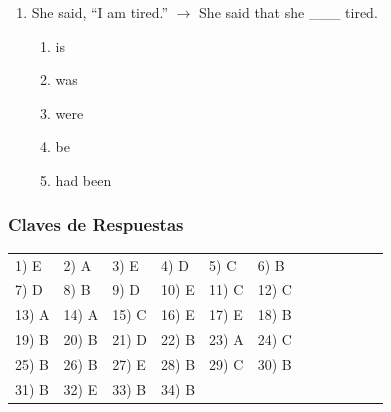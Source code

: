 \begin{enumerate}
	\item She said, ``I am tired.'' $\rightarrow$ She said that she \_\_\_ tired.
	\begin{enumerate}[label=\alph*)]
		\item is
		\item was
		\item were
		\item be
		\item had been
	\end{enumerate}

\end{enumerate}


\subsubsection*{Claves de Respuestas}

\begin{center}
	\begin{tabular}{ll ll ll ll ll ll}
		1) E & 2) A & 3) E & 4) D & 5) C & 6) B \\
		7) D & 8) B & 9) D & 10) E & 11) C & 12) C \\
		13) A & 14) A & 15) C & 16) E & 17) E & 18) B \\
		19) B & 20) B & 21) D & 22) B & 23) A & 24) C \\
		25) B & 26) B & 27) E & 28) B & 29) C & 30) B \\
		31) B & 32) E & 33) B & 34) B & & \\
	\end{tabular}
\end{center}


